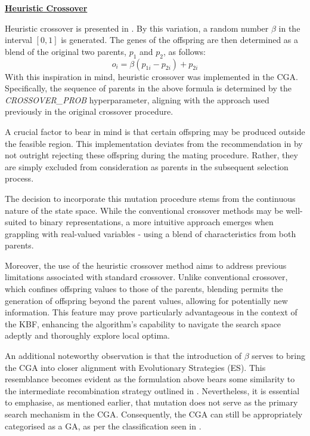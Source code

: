 \documentclass[10pt]{article}
\begin{document}
\begin{multicols}{2}
\textbf{\underline{Heuristic Crossover}}

Heuristic crossover is presented in \cite{Michalewicz_2011}. By this variation, a random number $\beta$ in the interval $[0, 1]$ is generated. The genes of the offspring are then determined as a blend of the original two parents, $p_1$ and $p_2$, as follows:
\[
    o_i = \beta (p_{1i} - p_{2i}) + p_{2i}
\]
With this inspiration in mind, heuristic crossover was implemented in the CGA. Specifically, the sequence of parents in the above formula is determined by the \textit{CROSSOVER\_PROB} hyperparameter, aligning with the approach used previously in the original crossover procedure.

A crucial factor to bear in mind is that certain offspring may be produced outside the feasible region. This implementation deviates from the recommendation in \cite{Michalewicz_2011} by not outright rejecting these offspring during the mating procedure. Rather, they are simply excluded from consideration as parents in the subsequent selection process.

The decision to incorporate this mutation procedure stems from the continuous nature of the state space. While the conventional crossover methods may be well-suited to binary representations, a more intuitive approach emerges when grappling with real-valued variables - using a blend of characteristics from both parents.

Moreover, the use of the heuristic crossover method aims to address previous limitations associated with standard crossover. Unlike conventional crossover, which confines offspring values to those of the parents, blending permits the generation of offspring beyond the parent values, allowing for potentially new information. This feature may prove particularly advantageous in the context of the KBF, enhancing the algorithm's capability to navigate the search space adeptly and thoroughly explore local optima.

An additional noteworthy observation is that the introduction of $\beta$ serves to bring the CGA into closer alignment with Evolutionary Strategies (ES). This resemblance becomes evident as the formulation above bears some similarity to the intermediate recombination strategy outlined in \cite{salimans2017evolution}. Nevertheless, it is essential to emphasise, as mentioned earlier, that mutation does not serve as the primary search mechanism in the CGA. Consequently, the CGA can still be appropriately categorised as a GA, as per the classification seen in \cite{10.1007/BFb0029787}.


\end{multicols}
\end{document}
